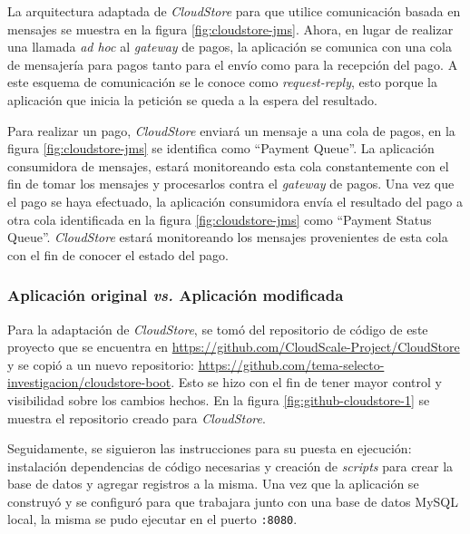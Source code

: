 \documentclass[11pt, twoside]{report}
\begin{document}
La arquitectura adaptada de \emph{CloudStore} para que utilice comunicación basada en mensajes se muestra en la figura \ref{fig:cloudstore-jms}. Ahora, en lugar de realizar una llamada \emph{ad hoc} al \emph{gateway} de pagos, la aplicación se comunica con una cola de mensajería para pagos tanto para el envío como para la recepción del pago. A este esquema de comunicación se le conoce como \emph{request-reply}, esto porque la aplicación que inicia la petición se queda a la espera del resultado.

Para realizar un pago, \emph{CloudStore} enviará un mensaje a una cola de pagos, en la figura \ref{fig:cloudstore-jms} se identifica como ``Payment Queue''. La aplicación consumidora de mensajes, estará monitoreando esta cola constantemente con el fin de tomar los mensajes y procesarlos contra el \emph{gateway} de pagos. Una vez que el pago se haya efectuado, la aplicación consumidora envía el resultado del pago a otra cola identificada en la figura \ref{fig:cloudstore-jms} como ``Payment Status Queue''. \emph{CloudStore} estará monitoreando los mensajes provenientes de esta cola con el fin de conocer el estado del pago.

\subsubsection{Aplicación original \emph{vs.} Aplicación modificada}
Para la adaptación de \emph{CloudStore}, se tomó del repositorio de código de este proyecto que se encuentra en \url{https://github.com/CloudScale-Project/CloudStore} y se copió a un nuevo repositorio: \url{https://github.com/tema-selecto-investigacion/cloudstore-boot}. Esto se hizo con el fin de tener mayor control y visibilidad sobre los cambios hechos. En la figura \ref{fig:github-cloudstore-1} se muestra el repositorio creado para \emph{CloudStore}.

Seguidamente, se siguieron las instrucciones para su puesta en ejecución: instalación dependencias de código necesarias y creación de \emph{scripts} para crear la base de datos y agregar registros a la misma. Una vez que la aplicación se construyó y se configuró para que trabajara junto con una base de datos MySQL local, la misma se pudo ejecutar en el puerto \texttt{:8080}.
\end{document}
